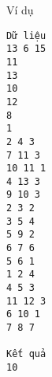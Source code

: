 Ví dụ
\begin{verbatim}
Dữ liệu
13 6 15
11
13
10
12
8
1
2 4 3
7 11 3
10 11 1
4 13 3
9 10 3
2 3 2
3 5 4
5 9 2
6 7 6
5 6 1
1 2 4
4 5 3
11 12 3
6 10 1
7 8 7

Kết quả
10
\end{verbatim}